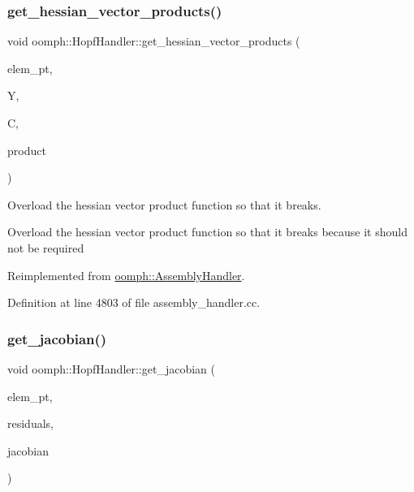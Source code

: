 \subsubsection{\texorpdfstring{get\+\_\+hessian\+\_\+vector\+\_\+products()}{get\_hessian\_vector\_products()}}
{\footnotesize\ttfamily void oomph\+::\+Hopf\+Handler\+::get\+\_\+hessian\+\_\+vector\+\_\+products (\begin{DoxyParamCaption}\item[{\hyperlink{classoomph_1_1GeneralisedElement}{Generalised\+Element} $\ast$const \&}]{elem\+\_\+pt,  }\item[{\hyperlink{classoomph_1_1Vector}{Vector}$<$ double $>$ const \&}]{Y,  }\item[{\hyperlink{classoomph_1_1DenseMatrix}{Dense\+Matrix}$<$ double $>$ const \&}]{C,  }\item[{\hyperlink{classoomph_1_1DenseMatrix}{Dense\+Matrix}$<$ double $>$ \&}]{product }\end{DoxyParamCaption})\hspace{0.3cm}{\ttfamily [virtual]}}



Overload the hessian vector product function so that it breaks. 

Overload the hessian vector product function so that it breaks because it should not be required 

Reimplemented from \hyperlink{classoomph_1_1AssemblyHandler_a296bef49838d23522bb660c4c5207f03}{oomph\+::\+Assembly\+Handler}.



Definition at line 4803 of file assembly\+\_\+handler.\+cc.

\mbox{\label{classoomph_1_1HopfHandler_ab36c50421f53accced01dd9e04d904ef}} 
\subsubsection{\texorpdfstring{get\+\_\+jacobian()}{get\_jacobian()}}
{\footnotesize\ttfamily void oomph\+::\+Hopf\+Handler\+::get\+\_\+jacobian (\begin{DoxyParamCaption}\item[{\hyperlink{classoomph_1_1GeneralisedElement}{Generalised\+Element} $\ast$const \&}]{elem\+\_\+pt,  }\item[{\hyperlink{classoomph_1_1Vector}{Vector}$<$ double $>$ \&}]{residuals,  }\item[{\hyperlink{classoomph_1_1DenseMatrix}{Dense\+Matrix}$<$ double $>$ \&}]{jacobian }\end{DoxyParamCaption})\hspace{0.3cm}{\ttfamily [virtual]}}



